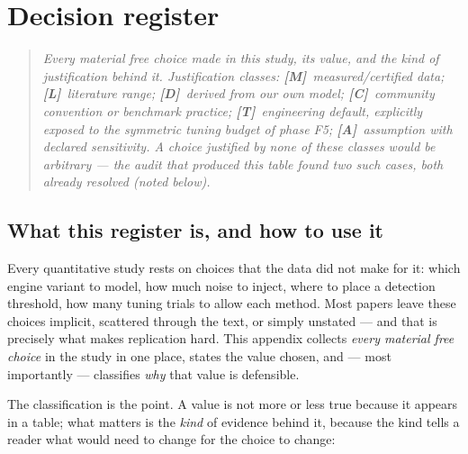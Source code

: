 \chapter{Decision register}
\label{ch:decisions}

\begin{quote}\itshape
Every material free choice made in this study, its value, and the \emph{kind} of justification
behind it. Justification classes: \textbf{[M]}~measured/certified data; \textbf{[L]}~literature
range; \textbf{[D]}~derived from our own model; \textbf{[C]}~community convention or benchmark
practice; \textbf{[T]}~engineering default, explicitly exposed to the symmetric tuning budget
of phase F5; \textbf{[A]}~assumption with declared sensitivity. A choice justified by none of
these classes would be arbitrary --- the audit that produced this table found two such cases,
both already resolved (noted below).
\end{quote}

\section*{What this register is, and how to use it}

Every quantitative study rests on choices that the data did not make for it: which engine
variant to model, how much noise to inject, where to place a detection threshold, how many
tuning trials to allow each method. Most papers leave these choices implicit, scattered
through the text, or simply unstated --- and that is precisely what makes replication hard.
This appendix collects \emph{every material free choice} in the study in one place, states
the value chosen, and --- most importantly --- classifies \emph{why} that value is defensible.

The classification is the point. A value is not more or less true because it appears in a
table; what matters is the \emph{kind} of evidence behind it, because the kind tells a reader
what would need to change for the choice to change:

